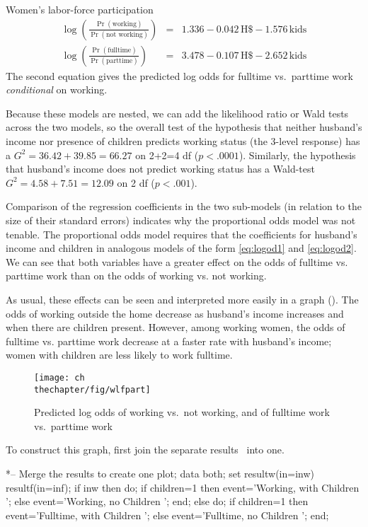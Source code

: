 \begin{Example}[wlfpart]{Women's labor-force participation}
\begin{eqnarray}
  \log \left( \frac{ \Pr ( \mbox{working} ) }
  { \Pr ( \mbox{not working} ) } \right) & = &
  1.336 - 0.042 \,  \mbox{H\$} - 1.576 \,  \mbox{kids} \label{eq:wlfnest1}\\
%
  \log \left( \frac{ \Pr ( \mbox{fulltime} ) }
  { \Pr ( \mbox{parttime} ) } \right) & = &
  3.478 - 0.107 \,  \mbox{H\$} - 2.652 \,  \mbox{kids} \label{eq:wlfnest2}
\end{eqnarray}
The second equation gives the predicted log odds for
fulltime vs.\ parttime work {\it conditional} on working.

Because these models are nested, we can add the likelihood ratio or Wald tests across the
two models, so the overall test of the hypothesis that neither
husband's income nor presence of children predicts working status
(the 3-level response) has a \(G^2 = 36.42  +  39.85 = 66.27\) on
2+2=4 df (\(p < .0001\)).  Similarly, the hypothesis that husband's
income does not predict working status has a Wald-test \(G^2 = 4.58
+  7.51 = 12.09\) on 2 df (\(p < .001\)).

Comparison of the regression coefficients in the two sub-models (in
relation to the size of their standard errors) indicates why the
proportional odds model was not tenable.  The proportional odds model
requires that the coefficients for husband's income and children in
analogous models of the form \eqref{eq:logod1} and \eqref{eq:logod2}.
We can see that both variables have a
greater effect on the odds of fulltime vs. parttime work than on the
odds of working vs. not working.

As usual, these effects can be seen and interpreted more easily in a
graph ().  The odds of working outside the home decrease as husband's
income increases and when there are children present.  However, among
working women, the odds of fulltime vs. parttime work decrease at a
faster rate with husband's income; women with children are less
likely to work fulltime.
\begin{figure}[htb]
  \centering
  \texttt{[image: ch\\thechapter/fig/wlfpart]}
  \caption{Predicted log odds of working vs.\ not working, and of fulltime work vs.\ parttime work}\label{fig:wlfpart}
\end{figure}

To construct this graph, first join the separate results \Dsets\
into one.

\begin{listing}
*-- Merge the results to create one plot;
data both;
   set resultw(in=inw)
       resultf(in=inf);
   if inw then do;
      if children=1 then event='Working, with Children ';
      else event='Working, no Children ';
   end;
   else do;
      if children=1 then event='Fulltime, with Children ';
      else event='Fulltime, no Children ';
  end;
\end{listing}


\end{Example}
